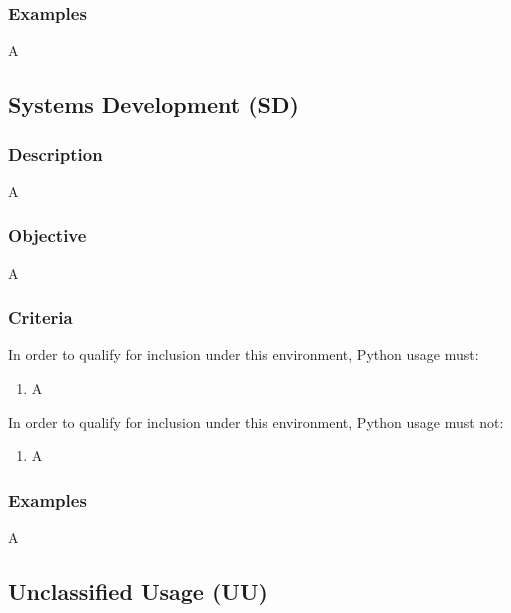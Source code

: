 		\subsubsection{Examples}

			A


	\subsection{Systems Development (SD)}

		\subsubsection{Description}

			A

		\subsubsection{Objective}

			A

		\subsubsection{Criteria}

			In order to qualify for inclusion under this environment, Python usage must:

			\begin{enumerate}
        		\item A
        	\end{enumerate}

			In order to qualify for inclusion under this environment, Python usage must not:

			\begin{enumerate}
        		\item A
        	\end{enumerate}

		\subsubsection{Examples}

			A


	\subsection{Unclassified Usage (UU)}

